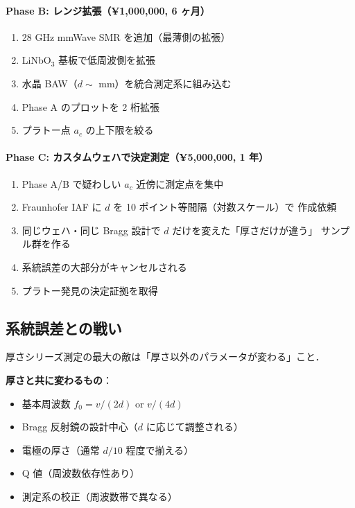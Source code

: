 \documentclass[11pt,a4paper]{article}
\begin{document}
\paragraph{Phase B: レンジ拡張（¥1,000,000, 6 ヶ月）}

\begin{enumerate}
\item 28 GHz mmWave SMR を追加（最薄側の拡張）
\item LiNbO$_3$ 基板で低周波側を拡張
\item 水晶 BAW（$d\sim$ mm）を統合測定系に組み込む
\item Phase A のプロットを 2 桁拡張
\item プラトー点 $a_c$ の上下限を絞る
\end{enumerate}

\paragraph{Phase C: カスタムウェハで決定測定（¥5,000,000, 1 年）}

\begin{enumerate}
\item Phase A/B で疑わしい $a_c$ 近傍に測定点を集中
\item Fraunhofer IAF に $d$ を 10 ポイント等間隔（対数スケール）で
作成依頼
\item 同じウェハ・同じ Bragg 設計で $d$ だけを変えた「厚さだけが違う」
サンプル群を作る
\item 系統誤差の大部分がキャンセルされる
\item プラトー発見の決定証拠を取得
\end{enumerate}

\subsection{系統誤差との戦い}

厚さシリーズ測定の最大の敵は「厚さ以外のパラメータが変わる」こと．

\textbf{厚さと共に変わるもの}：
\begin{itemize}
\item 基本周波数 $f_0 = v/(2d)$ or $v/(4d)$
\item Bragg 反射鏡の設計中心（$d$ に応じて調整される）
\item 電極の厚さ（通常 $d/10$ 程度で揃える）
\item Q 値（周波数依存性あり）
\item 測定系の校正（周波数帯で異なる）
\end{itemize}
\end{document}
